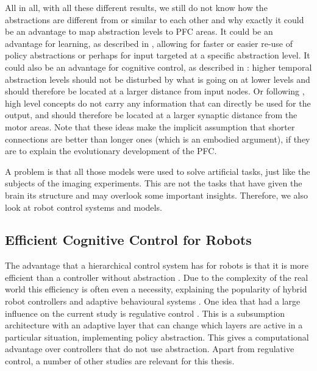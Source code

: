 \documentclass[10pt,a4paper]{report}
\begin{document}
All in all, with all these different results, we still do not know how the abstractions are different from or similar to each other and why exactly it could be an advantage to map abstraction levels to PFC areas. It could be an advantage for learning, as described in \citet{Reynolds2009}, allowing for faster or easier re-use of policy abstractions or perhaps for input targeted at a specific abstraction level. It could also be an advantage for cognitive control, as described in \citet{Botvinick2007}: higher temporal abstraction levels should not be disturbed by what is going on at lower levels and should therefore be located at a larger distance from input nodes. Or following \citet{Koechlin2003}, high level concepts do not carry any information that can directly be used for the output, and should therefore be located at a larger synaptic distance from the motor areas. Note that these ideas make the implicit assumption that shorter connections are better than longer ones (which is an embodied argument), if they are to explain the evolutionary development of the PFC. 

A problem is that all those models were used to solve artificial tasks, just like the subjects of the imaging experiments. This are not the tasks that have given the brain its structure and may overlook some important insights. Therefore, we also look at robot control systems and models.

\subsection*{Efficient Cognitive Control for Robots}

The advantage that a hierarchical control system has for robots is that it is more efficient than a controller without abstraction \citep{Dijk2011}. Due to the complexity of the real world this efficiency is often even a necessity, explaining the popularity of hybrid robot controllers and adaptive behavioural systems \citep{Scheutz2004}. One idea that had a large influence on the current study is regulative control \citep{Lagarde2010}. This is a subsumption architecture with an adaptive layer that can change which layers are active in a particular situation, implementing policy abstraction. This gives a computational advantage over controllers that do not use abstraction. Apart from regulative control, a number of other studies are relevant for this thesis.
\end{document}
